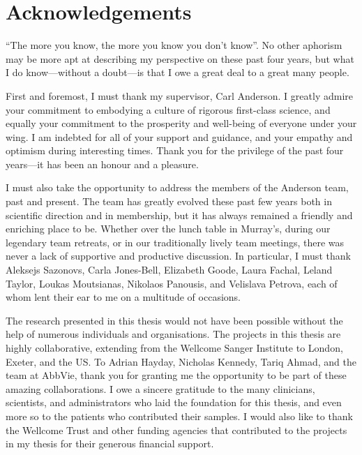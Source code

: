 %
%

\chapter{Acknowledgements}

\enquote{The more you know, the more you know you don't know}.
No other aphorism may be more apt at describing my perspective on these past four years,
but what I do know---without a doubt---is that I owe a great deal to a great many people.

First and foremost, I must thank my supervisor, Carl Anderson.
I greatly admire your commitment to embodying a culture of rigorous first-class science,
and equally your commitment to the prosperity and well-being of everyone under your wing. 
I am indebted for all of your support and guidance, 
and your empathy and optimism during interesting times.
Thank you for the privilege of the past four years---it has been an honour and a pleasure.

I must also take the opportunity to address the members of the Anderson team, past and present.
The team has greatly evolved these past few years both in scientific direction and in membership,
but it has always remained a friendly and enriching place to be. 
Whether over the lunch table in Murray's,
during our legendary team retreats,
or in our traditionally lively team meetings,
there was never a lack of supportive and productive discussion.
In particular, I must thank
    Aleksejs Sazonovs,
    Carla Jones-Bell,
    Elizabeth Goode,
    Laura Fachal,
    Leland Taylor,
    Loukas Moutsianas, 
    Nikolaos Panousis,
    and Velislava Petrova,
    each of whom lent their ear to me on a multitude of occasions.

The research presented in this thesis would not have been possible without the help of numerous individuals and organisations.
The projects in this thesis are highly collaborative, extending from the Wellcome Sanger Institute to London, Exeter, and the US.
To Adrian Hayday, Nicholas Kennedy, Tariq Ahmad, and the team at AbbVie, 
thank you for granting me the opportunity to be part of these amazing collaborations.
I owe a sincere gratitude to the many clinicians, scientists, and administrators who laid the foundation for this thesis,
and even more so to the patients who contributed their samples.
I would also like to thank the Wellcome Trust and other funding agencies that contributed to the projects in my thesis for their generous financial support.

